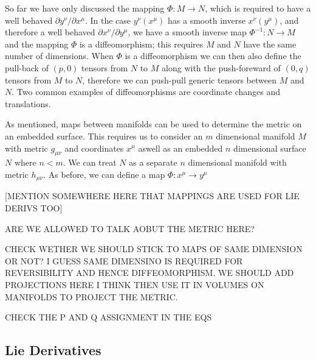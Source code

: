 So far we have only discussed the mapping $\Phi :M \rightarrow N$, which is required to have a well behaved $\partial y^\nu / \partial x^\mu$. In the case $y^\nu(x^\mu)$ has a smooth inverse $x^\nu(y^\mu)$, and therefore a well behaved $\partial x^\nu/\partial y^\mu$, we have a smooth inverse map $\Phi^{-1}:N \rightarrow M$ and the mapping $\Phi$ is a diffeomorphism; this requires $M$ and $N$ have the same number of dimensions. When $\Phi$ is a diffeomorphism we can then also define the pull-back of $(p,0)$ tensors from $N$ to $M$ along with the push-foreward of $(0,q)$ tensors from $M$ to $N$, therefore we can push-pull generic tensors between $M$ and $N$. Two common examples of diffeomorphisms are coordinate changes and translations.

As mentioned, maps between manifolds can be used to determine the metric on an embedded surface. This requires us to consider an $m$ dimensional manifold $M$ with metric $g_{\mu\nu}$ and coordinates $x^\mu$ aswell as an embedded $n$ dimensional surface $N$ where $n<m$. We can treat $N$ as a separate $n$ dimensional manifold with metric $h_{\mu\nu}$. As before, we can define a map $\Phi:x^\mu \rightarrow y^\mu$

[MENTION SOMEWHERE HERE THAT MAPPINGS ARE USED FOR LIE DERIVS TOO]

ARE WE ALLOWED TO TALK AOBUT THE METRIC HERE?

CHECK WETHER WE SHOULD STICK TO MAPS OF SAME DIMENSION OR NOT? I GUESS SAME DIMENSINO IS REQUIRED FOR REVERSIBILITY AND HENCE DIFFEOMORPHISM. WE SHOULD ADD PROJECTIONS HERE I THINK THEN USE IT IN VOLUMES ON MANIFOLDS TO PROJECT THE METRIC.

CHECK THE P AND Q ASSIGNMENT IN THE EQS



\subsection{Lie Derivatives}

